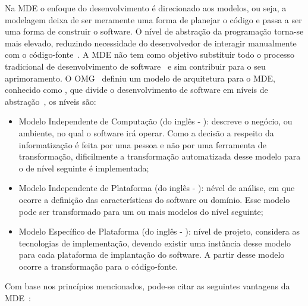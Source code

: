 Na MDE o enfoque do desenvolvimento é direcionado aos modelos, ou seja, a modelagem deixa de ser meramente uma forma de planejar o código e passa a ser uma forma de construir o software. O nível de abstração da programação torna-se mais elevado, reduzindo necessidade do desenvolvedor de interagir manualmente com o código-fonte~\cite{Braganca_Machado}. A MDE não tem como objetivo substituir todo o processo tradicional de desenvolvimento de software~\cite{Kleppe:2003, Brown_2007, Braganca_Machado} e sim contribuir para o seu aprimoramento. O OMG~\cite{ADM:OMG} definiu um modelo de arquitetura para o MDE, conhecido como , que divide o desenvolvimento de software em níveis de abstração~\cite{France_2007, Ben_Ammar}, os níveis são:

\begin{itemize}
	\item Modelo Independente de Computação (do inglês - ): descreve o negócio, ou ambiente, no qual o software irá operar. Como a decisão a respeito da informatização é feita por uma pessoa e não por uma ferramenta de transformação, dificilmente a transformação automatizada desse modelo para o de nível seguinte é implementada;
	\item Modelo Independente de Plataforma (do inglês - ): nével de análise, em que ocorre a definição das características do software ou domínio. Esse modelo pode ser transformado para um ou mais modelos do nível seguinte;
	\item Modelo Específico de Plataforma (do inglês - ): nível de projeto, considera as tecnologias de implementação, devendo existir uma instância desse modelo para cada plataforma de implantação do software. A partir desse modelo ocorre a transformação para o código-fonte.
\end{itemize}

Com base nos princípios mencionados, pode-se citar as seguintes vantagens da MDE~\cite{Hutchinson_2011, France_2007, Schmidt_2006}:

